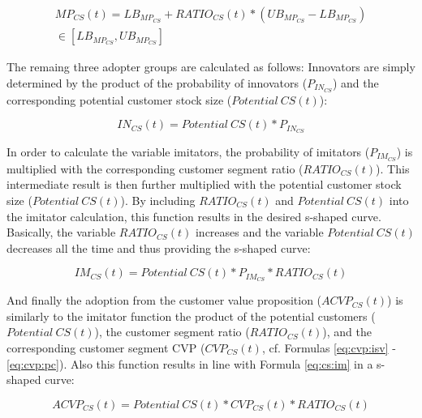 \begin{eqnarray}\label{eq:cs:mp}
	MP_{CS}(t) = LB_{MP_{CS}} + RATIO_{CS}(t) * (UB_{MP_{CS}} - LB_{MP_{CS}})  \nonumber \\ \in [LB_{MP_{CS}},UB_{MP_{CS}}]
\end{eqnarray}

The remaing three adopter groups are calculated as follows: Innovators are simply determined by the product of the probability of innovators ($P_{IN_{CS}}$) and the corresponding potential customer stock size \linebreak ($\mathit{Potential~CS(t)}$):

\begin{equation}\label{eq:cs:in}
		IN_{CS}(t) = \mathit{Potential~CS(t)} * P_{IN_{CS}}
\end{equation}

In order to calculate the variable imitators, the probability of imitators ($P_{IM_{CS}}$) is multiplied with the corresponding customer segment ratio ($RATIO_{CS}(t)$). This intermediate result is then further multiplied with the potential customer stock size ($\mathit{Potential~CS(t)}$). By including $RATIO_{CS}(t)$ and $\mathit{Potential~CS(t)}$ into the imitator calculation, this function results in the desired s-shaped curve. Basically, the variable $RATIO_{CS}(t)$ increases and the variable $\mathit{Potential~CS(t)}$ decreases all the time and thus providing the s-shaped curve:

\begin{equation}\label{eq:cs:im}
		IM_{CS}(t) = \mathit{Potential~CS(t)} * P_{IM_{CS}} * RATIO_{CS}(t)
\end{equation}

And finally the adoption from the customer value proposition \linebreak ($ACVP_{CS}(t)$) is similarly to the imitator function the product of the potential customers ($\mathit{Potential~CS(t)}$), the customer segment ratio ($RATIO_{CS}(t)$), and the corresponding customer segment \ac{CVP} ($CVP_{CS}(t)$, cf. Formulas \ref{eq:cvp:isv} - \ref{eq:cvp:pc}). Also this function results in line with Formula \ref{eq:cs:im} in a s-shaped curve:

\begin{equation}\label{eq:cs:acvp}
		ACVP_{CS}(t) = \mathit{Potential~CS(t)} * CVP_{CS}(t) * RATIO_{CS}(t)
\end{equation}

